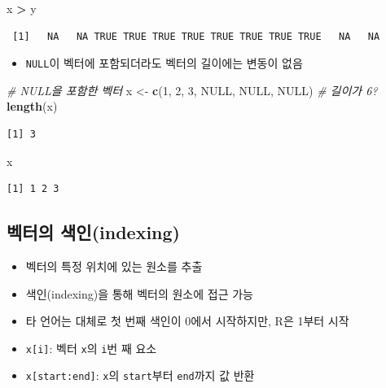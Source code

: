 \documentclass[
  11pt,
]{krantz}
\newenvironment{Shaded}{\begin{snugshade}}{\end{snugshade}}
\newcommand{\CommentTok}[1]{\textcolor[rgb]{0.37,0.37,0.37}{\textit{#1}}}
\newcommand{\DecValTok}[1]{\textcolor[rgb]{0.06,0.06,0.06}{#1}}
\newcommand{\KeywordTok}[1]{\textcolor[rgb]{0.27,0.27,0.27}{\textbf{#1}}}
\newcommand{\NormalTok}[1]{#1}
\newcommand{\OperatorTok}[1]{\textcolor[rgb]{0.43,0.43,0.43}{\textbf{#1}}}
\newcommand{\OtherTok}[1]{\textcolor[rgb]{0.37,0.37,0.37}{#1}}
\newcommand{\StringTok}[1]{\textcolor[rgb]{0.5,0.5,0.5}{#1}}
\providecommand{\tightlist}{%
  \setlength{\itemsep}{0pt}\setlength{\parskip}{0pt}}
\begin{document}
\begin{Shaded}
\begin{Highlighting}[]
\NormalTok{x }\OperatorTok{>}\StringTok{ }\NormalTok{y}
\end{Highlighting}
\end{Shaded}

\begin{verbatim}
 [1]   NA   NA TRUE TRUE TRUE TRUE TRUE TRUE TRUE TRUE   NA   NA
\end{verbatim}

\normalsize

\begin{itemize}
\tightlist
\item
  \texttt{NULL}이 벡터에 포함되더라도 벡터의 길이에는 변동이 없음
\end{itemize}

\footnotesize

\begin{Shaded}
\begin{Highlighting}[]
\CommentTok{# NULL을 포함한 벡터 }
\NormalTok{x <-}\StringTok{ }\KeywordTok{c}\NormalTok{(}\DecValTok{1}\NormalTok{, }\DecValTok{2}\NormalTok{, }\DecValTok{3}\NormalTok{, }\OtherTok{NULL}\NormalTok{, }\OtherTok{NULL}\NormalTok{, }\OtherTok{NULL}\NormalTok{) }\CommentTok{# 길이가 6?}
\KeywordTok{length}\NormalTok{(x)}
\end{Highlighting}
\end{Shaded}

\begin{verbatim}
[1] 3
\end{verbatim}

\begin{Shaded}
\begin{Highlighting}[]
\NormalTok{x}
\end{Highlighting}
\end{Shaded}

\begin{verbatim}
[1] 1 2 3
\end{verbatim}

\normalsize

\hypertarget{vector-index}{%
\subsection{벡터의 색인(indexing)}\label{vector-index}}

\begin{itemize}
\tightlist
\item
  벡터의 특정 위치에 있는 원소를 추출\\
\item
  색인(indexing)을 통해 벡터의 원소에 접근 가능
\item
  타 언어는 대체로 첫 번째 색인이 0에서 시작하지만, R은 1부터 시작
\item
  \texttt{x{[}i{]}}: 벡터 \texttt{x}의 \texttt{i}번 째 요소
\item
  \texttt{x{[}start:end{]}}: \texttt{x}의 \texttt{start}부터 \texttt{end}까지 값 반환
\end{itemize}
\end{document}
